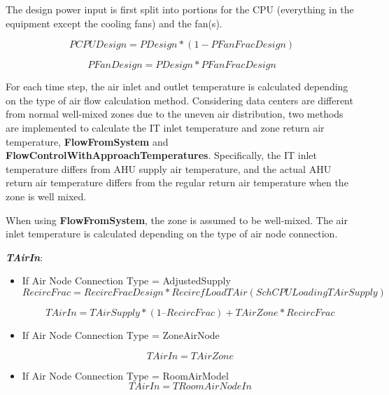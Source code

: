 The design power input is first split into portions for the CPU (everything in the equipment except the cooling fans) and the fan(s).

\begin{equation}
PCPUDesign = PDesign * (1 - PFanFracDesign)
\end{equation}

\begin{equation}
PFanDesign = PDesign * PFanFracDesign
\end{equation}

For each time step,  the air inlet and outlet temperature is calculated depending on the type of air flow calculation method. Considering data centers are different from normal well-mixed zones due to the uneven air distribution, two methods are implemented to calculate the IT inlet temperature and zone return air temperature, \textbf{FlowFromSystem} and \textbf{FlowControlWithApproachTemperatures}. Specifically, the IT inlet temperature differs from AHU supply air temperature, and the actual AHU return air temperature differs from the regular return air temperature when the zone is well mixed.

When using \textbf{FlowFromSystem}, the zone is assumed to be well-mixed. The air inlet temperature is calculated depending on the type of air node connection.

\emph{\textbf{TAirIn}}:

\begin{itemize}
    \tightlist
  \item
    If Air Node Connection Type = AdjustedSupply
\begin{equation}
RecircFrac = RecircFracDesign * RecircfLoadTAir(SchCPULoading TAirSupply)
\end{equation}

\begin{equation}
TAirIn = TAirSupply * (1 – RecircFrac) +TAirZone * RecircFrac
\end{equation}

  \item
    If Air Node Connection Type = ZoneAirNode
    
\begin{equation}
TAirIn = TAirZone
\end{equation}

  \item
    If Air Node Connection Type = RoomAirModel
\begin{equation}
TAirIn = TRoomAirNodeIn
\end{equation}

\end{itemize}

